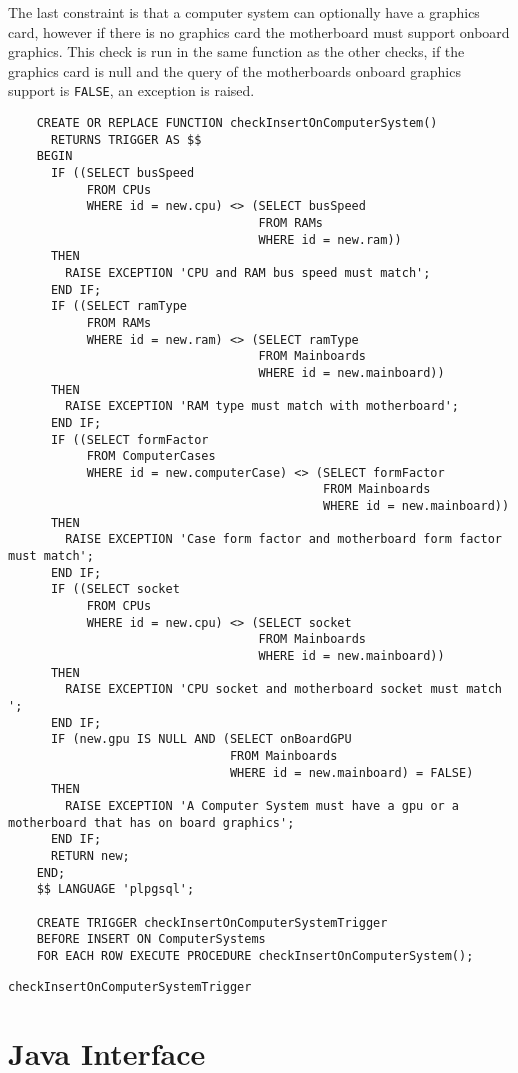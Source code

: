 \documentclass[12pt,a4paper]{article}
\begin{document}
The last constraint is that a computer system can optionally have a graphics card, however if there is no graphics card the motherboard must support onboard graphics. 
This check is run in the same function as the other checks, if the  graphics card is null and the query of the motherboards onboard graphics support is \texttt{FALSE}, an exception is raised. 

\begin{listing}[!htbp]
	\begin{verbatim}
	CREATE OR REPLACE FUNCTION checkInsertOnComputerSystem()
	  RETURNS TRIGGER AS $$
	BEGIN
	  IF ((SELECT busSpeed
	       FROM CPUs
	       WHERE id = new.cpu) <> (SELECT busSpeed
	                               FROM RAMs
	                               WHERE id = new.ram))
	  THEN
	    RAISE EXCEPTION 'CPU and RAM bus speed must match';
	  END IF;
	  IF ((SELECT ramType
	       FROM RAMs
	       WHERE id = new.ram) <> (SELECT ramType
	                               FROM Mainboards
	                               WHERE id = new.mainboard))
	  THEN
	    RAISE EXCEPTION 'RAM type must match with motherboard';
	  END IF;
	  IF ((SELECT formFactor
	       FROM ComputerCases
	       WHERE id = new.computerCase) <> (SELECT formFactor
	                                        FROM Mainboards
	                                        WHERE id = new.mainboard))
	  THEN
	    RAISE EXCEPTION 'Case form factor and motherboard form factor must match';
	  END IF;
	  IF ((SELECT socket
	       FROM CPUs
	       WHERE id = new.cpu) <> (SELECT socket
	                               FROM Mainboards
	                               WHERE id = new.mainboard))
	  THEN
	    RAISE EXCEPTION 'CPU socket and motherboard socket must match ';
	  END IF;
	  IF (new.gpu IS NULL AND (SELECT onBoardGPU
	                           FROM Mainboards
	                           WHERE id = new.mainboard) = FALSE)
	  THEN
	    RAISE EXCEPTION 'A Computer System must have a gpu or a motherboard that has on board graphics';
	  END IF;
	  RETURN new;
	END;
	$$ LANGUAGE 'plpgsql';

	CREATE TRIGGER checkInsertOnComputerSystemTrigger
	BEFORE INSERT ON ComputerSystems
	FOR EACH ROW EXECUTE PROCEDURE checkInsertOnComputerSystem();
	\end{verbatim}
	\caption{\texttt{checkInsertOnComputerSystemTrigger}}
	\label{lst:trigger}

\end{listing}

\section{Java Interface}
\end{document}
